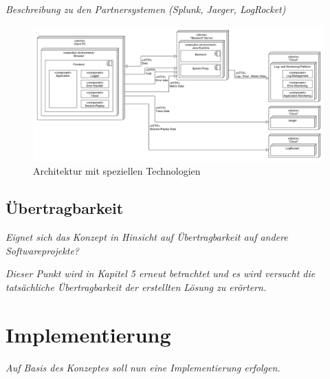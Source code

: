 	\textit{\color{red}Beschreibung zu den Partnersystemen (Splunk, Jaeger, LogRocket)}
	
\begin{figure}[H]
	\centering
	\includegraphics[width=0.75\linewidth]{img/04_erstellung-poc/konzept-technologien.png}
	\caption{Architektur mit speziellen Technologien}
	\label{fig:architektur-technologien}
\end{figure}

	\subsection{Übertragbarkeit}

	\textit{Eignet sich das Konzept in Hinsicht auf Übertragbarkeit auf andere Softwareprojekte?}

	\textit{Dieser Punkt wird in Kapitel 5 erneut betrachtet und es wird versucht die tatsächliche Übertragbarkeit der erstellten Lösung zu erörtern.}

\section{Implementierung}

	\textit{Auf Basis des Konzeptes soll nun eine Implementierung erfolgen.}